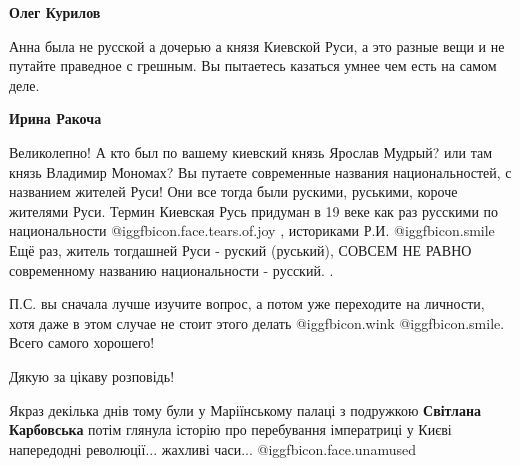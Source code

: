 \begin{itemize}
\begin{itemize}
\begin{itemize}
\end{itemize} %

\textbf{Олег Курилов} 

Анна была не русской а дочерью а князя Киевской Руси, а это разные вещи и не
путайте праведное с грешным. Вы пытаетесь казаться умнее чем есть на самом
деле.

\begin{itemize} %
\textbf{Ирина Ракоча} 

Великолепно! А кто был по вашему киевский князь Ярослав Мудрый? или там князь
Владимир Мономах? Вы путаете современные названия национальностей, с названием
жителей Руси! Они все тогда были рускими, руськими, короче жителями Руси.
Термин Киевская Русь придуман в 19 веке как раз русскими по национальности
@igg{fbicon.face.tears.of.joy} , историками Р.И.  @igg{fbicon.smile}  Ещё раз,
житель тогдашней Руси - руский (руський), СОВСЕМ НЕ РАВНО современному названию
национальности - русский. . 

П.С. вы сначала лучше изучите вопрос, а потом уже
переходите на личности, хотя даже в этом случае не стоит этого делать
@igg{fbicon.wink}   @igg{fbicon.smile}. Всего самого хорошего!

\end{itemize} %

\end{itemize} %

Дякую за цікаву розповідь!


Якраз декілька днів тому були у Маріїнському палаці з подружкою \textbf{Світлана
Карбовська} потім глянула історію про перебування імператриці у Києві напередодні
революції... жахливі часи... @igg{fbicon.face.unamused} 


\end{itemize} %
